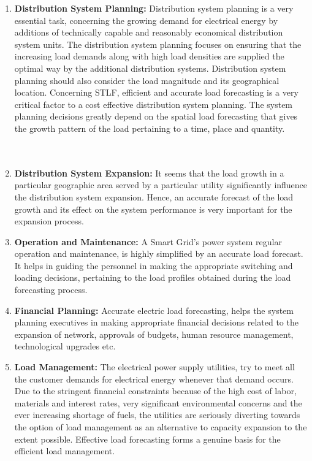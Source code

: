 \begin{enumerate}
\item \textbf{Distribution System Planning:} Distribution system planning is a very essential task, concerning the growing demand for electrical energy by additions of technically capable and reasonably economical distribution system units. The distribution system planning focuses on ensuring that the increasing load demands along with high load densities are supplied the optimal way by the additional distribution systems. Distribution system planning should also consider the load magnitude and its geographical location. Concerning STLF, efficient and accurate load forecasting is a very critical factor to a cost effective distribution system planning. The system planning decisions greatly depend on the spatial load forecasting that gives the growth pattern of the load pertaining to a time, place and quantity.\\
\\
\\
\item \textbf{Distribution System Expansion:} It seems that the load growth in a particular geographic area served by a particular utility significantly influence the distribution system expansion. Hence, an accurate forecast of the load growth and its effect on the system performance is very important for the expansion process.
\item \textbf{Operation and Maintenance:} A Smart Grid's power system regular operation and maintenance, is highly simplified by an accurate load forecast. It helps in guiding the personnel in making the appropriate switching and loading decisions, pertaining to the load profiles obtained during the load forecasting process.
\item \textbf{Financial Planning:} Accurate electric load forecasting, helps the system planning executives in making appropriate financial decisions related to the expansion of network, approvals of budgets, human resource management, technological upgrades etc.
\item \textbf{Load Management:} The electrical power supply utilities, try to meet all the customer demands for electrical energy whenever that demand occurs. Due to the stringent financial constraints because of the high cost of labor, materials and interest rates, very significant environmental concerns and the ever increasing shortage of fuels, the utilities are seriously diverting towards the option of load management as an alternative to capacity expansion to the extent possible. Effective load forecasting forms a genuine basis for the efficient load management.
\end{enumerate}
